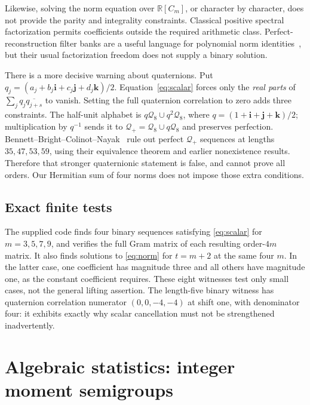 \documentclass[11pt]{article}
\newcommand{\R}{\mathbb R}
\begin{document}
Likewise, solving the norm equation over $\R[C_m]$, or character by
character, does not provide the parity and integrality constraints.
Classical positive spectral factorization permits coefficients outside
the required arithmetic class. Perfect-reconstruction filter banks are
a useful language for polynomial norm identities~\cite{Filters}, but
their usual factorization freedom does not supply a binary solution.

There is a more decisive warning about quaternions. Put
$q_j=(a_j+b_j\mathbf i+c_j\mathbf j+d_j\mathbf k)/2$.
Equation~\eqref{eq:scalar} forces only the \emph{real parts} of
$\sum_jq_j\overline{q_{j+s}}$ to vanish. Setting the full quaternion
correlation to zero adds three constraints. The half-unit alphabet is
$q\mathcal Q_8\cup q^2\mathcal Q_8$, where
$q=(1+\mathbf i+\mathbf j+\mathbf k)/2$; multiplication by $q^{-1}$
sends it to $\mathcal Q_+=\mathcal Q_8\cup q\mathcal Q_8$ and preserves
perfection. Bennett--Bright--Colinot--Nayak~\cite{Quaternion} rule out
perfect $\mathcal Q_+$ sequences at lengths $35,47,53,59$, using their
equivalence theorem and earlier nonexistence results. Therefore that
stronger quaternionic statement is false, and cannot prove all orders.
Our Hermitian sum of four norms does not impose those extra conditions.

\subsection{Exact finite tests}
The supplied code finds four binary sequences satisfying
\eqref{eq:scalar} for $m=3,5,7,9$, and verifies the full Gram matrix of
each resulting order-$4m$ matrix. It also finds solutions to
\eqref{eq:norm} for $t=m+2$ at the same four $m$. In the latter case,
one coefficient has magnitude three and all others have magnitude one,
as the constant coefficient requires. These eight witnesses test only
small cases, not the general lifting assertion. The length-five binary
witness has quaternion correlation numerator $(0,0,-4,-4)$ at shift
one, with denominator four: it exhibits exactly why scalar cancellation
must not be strengthened inadvertently.

\section{Algebraic statistics: integer moment semigroups}
\end{document}
